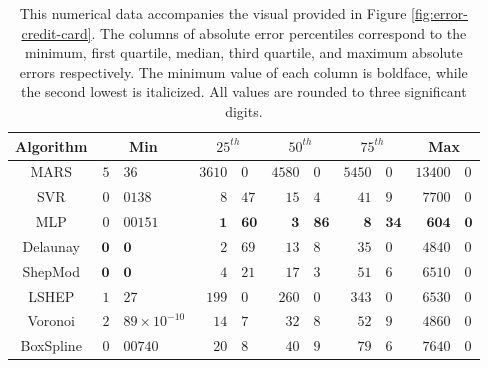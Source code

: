 \documentclass[doublespace,nopageskip]{VTthesis} %
\begin{document}
\begin{appendices}
  \begin{table}
    \centering
    \begin{tabular}{c|r@{.}l|r@{.}l|r@{.}l|r@{.}l|r@{.}l}
      \hline
      Algorithm & \multicolumn{2}{c|}{Min} & \multicolumn{2}{c|}{$25^{th}$} & \multicolumn{2}{c|}{$50^{th}$} & \multicolumn{2}{c|}{$75^{th}$} & \multicolumn{2}{c}{Max}\\
      \hline
      MARS & $5$&$36$ & $3610$&$0$ & $4580$&$0$ & $5450$&$0$ & $13400$&$0$\\
      SVR & $0$&$0138$ & $8$&$47$ & $15$&$4$ & $41$&$9$ & $7700$&$0$\\
      MLP & $0$&$00151$ & $\mathbf{1}$&$\mathbf{60}$ & $\mathbf{3}$&$\mathbf{86}$ & $\mathbf{8}$&$\mathbf{34}$ & $\mathbf{604}$&$\mathbf{0}$\\
      Delaunay & $\mathbf{0}$&$\mathbf{0}$ & $\mathit{2}$&$\mathit{69}$ & $\mathit{13}$&$\mathit{8}$ & $\mathit{35}$&$\mathit{0}$ & $\mathit{4840}$&$\mathit{0}$\\
      ShepMod & $\mathbf{0}$&$\mathbf{0}$ & $4$&$21$ & $17$&$3$ & $51$&$6$ & $6510$&$0$\\
      LSHEP & $1$&$27$ & $199$&$0$ & $260$&$0$ & $343$&$0$ & $6530$&$0$\\
      Voronoi & $\mathit{2}$&$\mathit{89 \times 10^{-10}}$ & $14$&$7$ & $32$&$8$ & $52$&$9$ & $4860$&$0$\\
      BoxSpline & $0$&$00740$ & $20$&$8$ & $40$&$9$ & $79$&$6$ & $7640$&$0$\\
      \hline
    \end{tabular}
    \caption{This numerical data accompanies the visual provided in
      Figure \ref{fig:error-credit-card}. The columns of absolute error
      percentiles correspond to the minimum, first quartile, median,
      third quartile, and maximum absolute errors respectively. The
      minimum value of each column is boldface, while the second lowest
      is italicized. All values are rounded to three significant
      digits.}
    \label{table:error-credit-card}
  \end{table}


\end{appendices}
\end{document}
